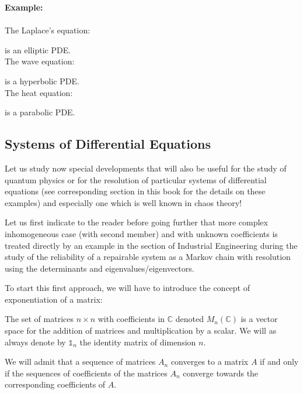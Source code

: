 	\begin{tcolorbox}[colframe=black,colback=white,sharp corners]
	\textbf{{\Large {}}Example:}\\\\
	The Laplace's equation:
	
	is an elliptic PDE.\\

	The wave equation:
	
	is a hyperbolic PDE.\\

	The heat equation:
	
	is a parabolic PDE.
	\end{tcolorbox}
	
	\pagebreak
	\subsection{Systems of Differential Equations}
	Let us study now special developments that will also be useful for the study of quantum physics or for the resolution of particular systems of differential equations (see corresponding section in this book for the details on these examples) and especially one which is well known in chaos theory!
	
	Let us first indicate to the reader before going further that more complex inhomogeneous case (with second member) and with unknown coefficients is treated directly by an example in the section of Industrial Engineering during the study of the reliability of a repairable system as a Markov chain with resolution using the determinants and eigenvalues/eigenvectors.
	
	To start this first approach, we will have to introduce the concept of exponentiation of a matrix:

	The set of matrices $n \times n$ with coefficients in $\mathbb{C}$ denoted $M_n(\mathbb{C})$ is a vector space for the addition of matrices and multiplication by a scalar. We will as always denote by $\mathds{1}_n$ the identity matrix of dimension $n$.
	
	We will admit that a sequence of matrices $A_n$ converges to a matrix $A$ if and only if the sequences of coefficients of the matrices $A_n$ converge towards the corresponding coefficients of $A$.
	
